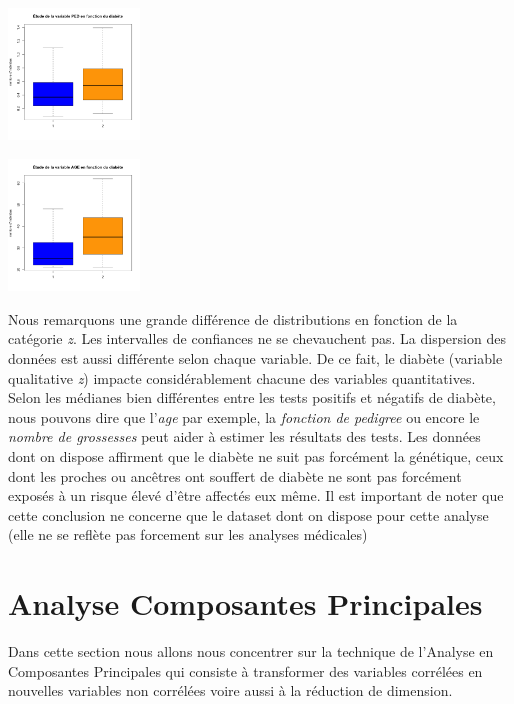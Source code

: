 \documentclass[10pt]{article}
\begin{document}
\begin{center}
\begin{minipage}[t]{0.3\textwidth}
	\end{minipage}
	\newline
	\begin{minipage}[t]{0.3\textwidth}
		\includegraphics[width=35mm]{Figures/Pima/bxp_z_ped.png}
	\end{minipage}
	\begin{minipage}[t]{0.3\textwidth}
		\includegraphics[width=35mm]{Figures/Pima/bxp_z_age.png}
	\end{minipage}
\end{center}

Nous remarquons une grande différence de distributions en fonction de la catégorie \textit{z}. Les intervalles de confiances ne se chevauchent pas. La dispersion des données est aussi différente selon chaque variable. De ce fait, le diabète (variable  qualitative \textit{z}) impacte considérablement chacune des variables quantitatives. 
Selon les médianes bien différentes entre les tests positifs et négatifs de diabète, nous pouvons dire que l'\textit{age} par exemple, la \textit{fonction de pedigree} ou encore le \textit{nombre de grossesses} peut aider à estimer les résultats des tests.
Les données dont on dispose affirment que le diabète ne suit pas forcément la génétique, ceux dont les proches ou ancêtres ont souffert de diabète ne sont pas forcément exposés à un risque élevé d'être affectés eux même. Il est important de noter que cette conclusion ne concerne que le dataset dont on dispose pour cette analyse (elle ne se reflète pas forcement sur les analyses médicales)
	
	\section{Analyse Composantes Principales}
	Dans cette section nous allons nous concentrer sur la technique de l’Analyse en Composantes Principales qui consiste à transformer des variables corrélées en nouvelles variables non corrélées voire aussi à la réduction de dimension.
\end{document}
